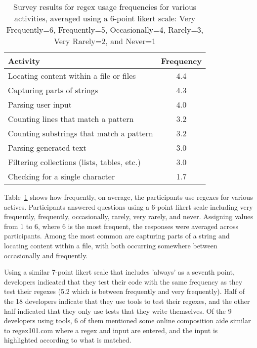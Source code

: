 \begin{table}
\caption{Survey results for regex usage frequencies for various activities, averaged using a 6-point likert scale: Very Frequently=6, Frequently=5, Occasionally=4, Rarely=3, Very Rarely=2, and Never=1 \label{tab:regexactivities}}
\begin{center}
\begin{tabular}{l|c}
Activity & Frequency \\ \hline
Locating content within a file or files & 4.4\\
Capturing parts of strings & 4.3 \\
Parsing user input & 4.0\\
Counting lines that match a pattern & 3.2\\
Counting  substrings that match a pattern & 3.2\\
Parsing generated text & 3.0\\
Filtering collections (lists, tables, etc.) & 3.0 \\
Checking for a single character & 1.7\\


\end{tabular}
\end{center}
\end{table}

Table~\ref{tab:regexactivities} shows how frequently, on average, the participants use
regexes for various actives.
Participants answered questions using a 6-point likert scale including very frequently, frequently, occasionally, rarely, very rarely, and never.
Assigning values from 1 to 6, where 6 is the most frequent, the responses were averaged across participants.
Among the most common are capturing parts of a string and locating content within a file, with both occurring somewhere between occasionally and frequently.

Using a similar 7-point likert scale that includes 'always' as a seventh point, developers indicated that they test their code with the same frequency as they test their regexes (5.2 which is between frequently and very frequently).  Half of the 18 developers indicate that they use tools to test their regexes, and the other half indicated that they only use tests that they write themselves. Of the 9 developers using tools, 6 of them mentioned some online composition aide similar to regex101.com where a regex and input are entered, and the input is highlighted according to what is matched.

